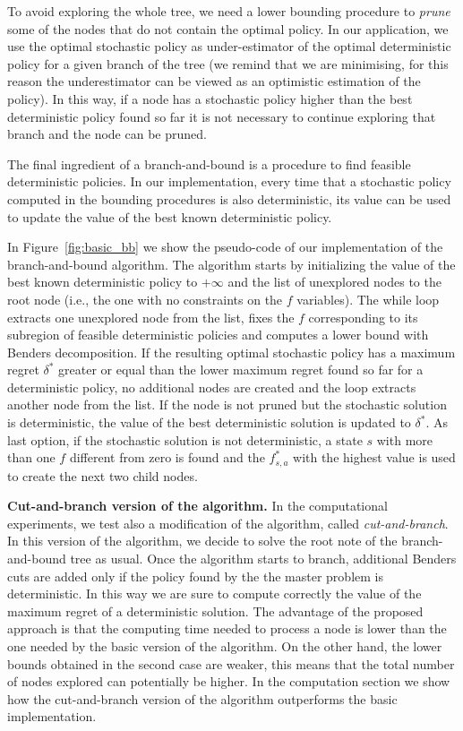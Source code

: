 \documentclass[runningheads,a4paper]{llncs}
\begin{document}
To avoid exploring the whole tree, we need a lower bounding procedure to \textit{prune} some of the nodes that do not contain the optimal policy. In our application, we use the optimal stochastic policy as under-estimator of the optimal deterministic policy for a given branch of the tree (we remind that we are minimising, for this reason the underestimator can be viewed as an optimistic estimation of the policy). In this way, if a node has a stochastic policy higher than the best deterministic policy found so far it is not necessary to continue exploring that branch and the node can be pruned.

The final ingredient of a branch-and-bound is a procedure to find feasible deterministic policies. In our implementation, every time that a stochastic policy computed in the bounding procedures is also deterministic, its value can be used to update the value of the best known deterministic policy. %


In Figure~\ref{fig:basic_bb} we show the pseudo-code of our implementation of the branch-and-bound algorithm. The algorithm starts by initializing the value of the best known deterministic policy to $+\infty$ and the list of unexplored nodes to the root node (i.e., the one with no constraints on the $f$ variables).
The while loop extracts one unexplored node from the list, fixes the $f$ corresponding to its subregion of feasible deterministic policies and computes a lower bound with Benders decomposition. If the resulting optimal stochastic policy has a maximum regret $\delta^*$ greater or equal than the lower maximum regret found so far for a deterministic policy, no additional nodes are created and the loop extracts another node from the list. If the node is not pruned but the stochastic solution is deterministic, the value of the best deterministic solution is updated to $\delta^*$. As last option, if the stochastic solution is not deterministic, a state $s$ with more than one $f$ different from zero is found and the $f^*_{s,a}$ with the highest value is used to create the next two child nodes.

\textbf{Cut-and-branch version of the algorithm.}  %
In the computational experiments, we test also a modification of the algorithm, called \textit{cut-and-branch}. In this version of the algorithm, we decide to solve the root note of the branch-and-bound tree as usual. %
Once the algorithm starts to branch, additional Benders cuts are added only if the policy found by the the master problem is deterministic. In this way we are sure to compute correctly the value of the maximum regret of a deterministic solution. The advantage of the proposed approach is that the computing time needed to process a node is lower than the one needed by the basic version of the algorithm. On the other hand, the lower bounds obtained in the second case are weaker, this means that the total number of nodes explored can potentially be higher.
In the computation section we show how the cut-and-branch version of the algorithm outperforms the basic implementation.    
\end{document}

